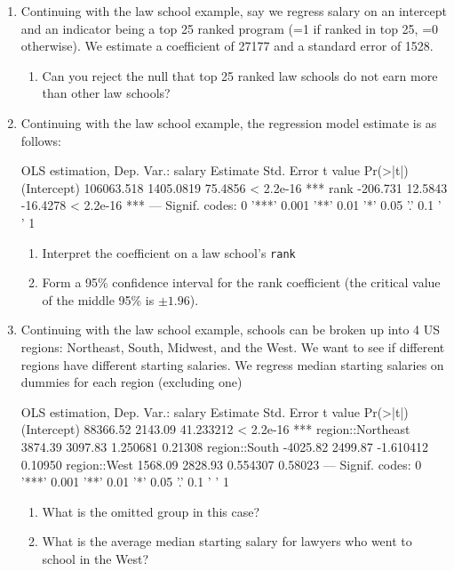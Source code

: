 \documentclass[12pt]{article}
\begin{document}
\begin{enumerate}
  \vspace{5mm}
  \item Continuing with the law school example, say we regress salary on an intercept and an indicator being a top 25 ranked program (=1 if ranked in top 25, =0 otherwise). We estimate a coefficient of 27177 and a standard error of 1528. 
  \begin{enumerate}
    \item Can you reject the null that top 25 ranked law schools do not earn more than other law schools?
  \end{enumerate}




  \vspace{5mm}
  \item Continuing with the law school example, the regression model estimate is as follows: 
  \begin{codeblock}[{}]
OLS estimation, Dep. Var.: salary
               Estimate  Std. Error   t value   Pr(>|t|)    
(Intercept)  106063.518   1405.0819   75.4856  < 2.2e-16 ***
rank           -206.731     12.5843  -16.4278  < 2.2e-16 ***
---
Signif. codes:  0 '***' 0.001 '**' 0.01 '*' 0.05 '.' 0.1 ' ' 1
  \end{codeblock}

  \begin{enumerate}
    \item Interpret the coefficient on a law school's \texttt{rank}
    
    \item Form a 95\% confidence interval for the rank coefficient (the critical value of the middle 95\% is $\pm 1.96$).
  \end{enumerate}
  



  \vspace{5mm}
  \item Continuing with the law school example, schools can be broken up into 4 US regions: Northeast, South, Midwest, and the West. We want to see if different regions have different starting salaries. We regress median starting salaries on dummies for each region (excluding one)
  \begin{codeblock}[{}]
OLS estimation, Dep. Var.: salary
                    Estimate Std. Error   t value  Pr(>|t|)    
(Intercept)        88366.52    2143.09 41.233212 < 2.2e-16 ***
region::Northeast   3874.39    3097.83  1.250681   0.21308    
region::South      -4025.82    2499.87 -1.610412   0.10950    
region::West        1568.09    2828.93  0.554307   0.58023    
---
Signif. codes:  0 '***' 0.001 '**' 0.01 '*' 0.05 '.' 0.1 ' ' 1
  \end{codeblock}

  \begin{enumerate}
    \item What is the omitted group in this case?

    \item What is the average median starting salary for lawyers who went to school in the West? 
  \end{enumerate}

\end{enumerate}
\end{document}
